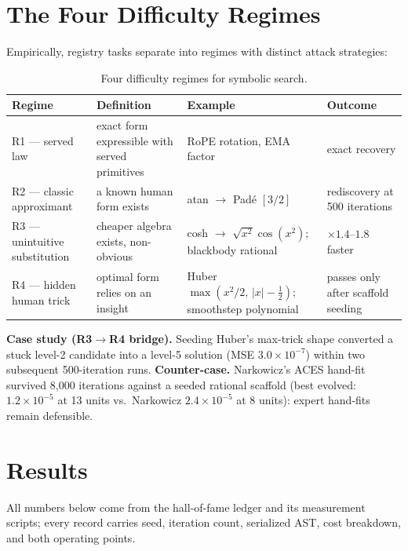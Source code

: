 \documentclass[11pt]{article}
\begin{document}
\section{The Four Difficulty Regimes}
\label{sec:regimes}
Empirically, registry tasks separate into regimes with distinct attack strategies:

\begin{table}[h]
\centering
\caption{Four difficulty regimes for symbolic search.}
\label{tab:regimes}
\begin{tabular}{@{}llll@{}}
\toprule
Regime & Definition & Example & Outcome \\
\midrule
R1 --- served law & exact form expressible with served primitives & RoPE rotation, EMA factor & exact recovery \\
R2 --- classic approximant & a known human form exists & atan $\to$ Pad\'e $[3/2]$ & rediscovery at 500 iterations \\
R3 --- unintuitive substitution & cheaper algebra exists, non-obvious & cosh $\to$ $\sqrt{x^2}\cos(x^2)$; blackbody rational & $\times1.4$--$1.8$ faster \\
R4 --- hidden human trick & optimal form relies on an insight & Huber $\max(x^2/2,\,|x|-\tfrac12)$; smoothstep polynomial & passes only after scaffold seeding \\
\bottomrule
\end{tabular}
\end{table}

\noindent\textbf{Case study (R3$\to$R4 bridge).} Seeding Huber's max-trick shape converted a stuck level-2 candidate into a level-5 solution (MSE $3.0\times10^{-7}$) within two subsequent 500-iteration runs. \textbf{Counter-case.} Narkowicz's ACES hand-fit survived 8{,}000 iterations against a seeded rational scaffold (best evolved: $1.2\times10^{-5}$ at 13 units vs.\ Narkowicz $2.4\times10^{-5}$ at 8 units): expert hand-fits remain defensible.

\section{Results}
All numbers below come from the hall-of-fame ledger and its measurement scripts; every record carries seed, iteration count, serialized AST, cost breakdown, and both operating points.
\end{document}
